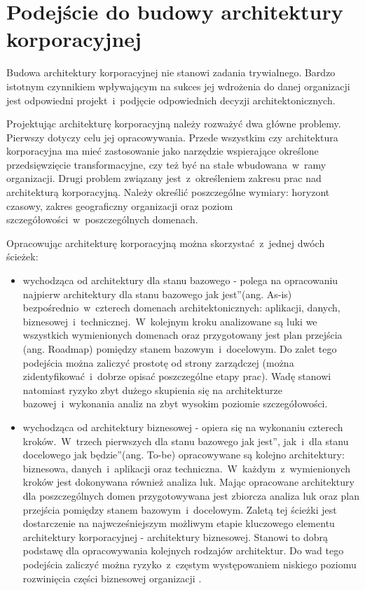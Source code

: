 \section{Podejście do budowy architektury korporacyjnej}
Budowa architektury korporacyjnej nie stanowi zadania trywialnego. Bardzo istotnym czynnikiem wpływającym na sukces jej wdrożenia do danej organizacji jest odpowiedni projekt~i~podjęcie odpowiednich decyzji architektonicznych. 

Projektując architekturę korporacyjną należy rozważyć dwa główne problemy. Pierwszy dotyczy celu jej opracowywania. Przede wszystkim czy architektura korporacyjna ma mieć zastosowanie jako narzędzie wspierające określone przedsięwzięcie transformacyjne, czy też być na stałe wbudowana~w~ramy organizacji. Drugi problem związany jest~z~określeniem zakresu prac nad architekturą korporacyjną. Należy określić poszczególne wymiary: horyzont czasowy, zakres geograficzny organizacji oraz poziom szczegółowości~w~poszczególnych domenach. 

Opracowując architekturę korporacyjną można skorzystać~z~jednej dwóch ścieżek:
\begin{itemize}
\item{wychodząca od architektury dla stanu bazowego - polega na opracowaniu najpierw architektury dla stanu bazowego \quotedblbase jak jest\textquotedblright (ang. As-is) bezpośrednio~w~czterech domenach architektonicznych: aplikacji, danych, biznesowej~i~technicznej.~W~kolejnym kroku analizowane są luki we wszystkich wymienionych domenach oraz przygotowany jest plan przejścia (ang. Roadmap) pomiędzy stanem bazowym~i~docelowym. Do zalet tego podejścia można zaliczyć prostotę od strony zarządczej (można zidentyfikować~i~dobrze opisać poszczególne etapy prac). Wadę stanowi natomiast ryzyko zbyt dużego skupienia się na architekturze bazowej~i~wykonania analiz na zbyt wysokim poziomie szczegółowości.}
\item{wychodząca od architektury biznesowej - opiera się na wykonaniu czterech kroków.~W~trzech pierwszych dla stanu bazowego \quotedblbase jak jest\textquotedblright, jak~i~dla stanu docelowego \quotedblbase jak będzie\textquotedblright (ang. To-be) opracowywane są kolejno architektury: biznesowa, danych~i~aplikacji oraz techniczna.~W~każdym~z~wymienionych kroków jest dokonywana również analiza luk. Mając opracowane architektury dla poszczególnych domen przygotowywana jest zbiorcza analiza luk oraz plan przejścia pomiędzy stanem bazowym~i~docelowym. Zaletą tej ścieżki jest dostarczenie na najwcześniejszym możliwym etapie kluczowego elementu architektury korporacyjnej - architektury biznesowej. Stanowi to dobrą podstawę dla opracowywania kolejnych rodzajów architektur. Do wad tego podejścia zaliczyć można ryzyko~z~częstym występowaniem niskiego poziomu rozwinięcia części biznesowej organizacji \cite{ArchKorpSob}.}
\end{itemize}

